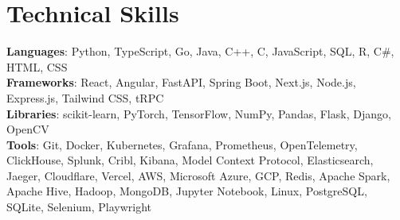 \documentclass[letterpaper,11pt]{article}
\begin{document}
\section{Technical Skills}
 \begin{itemize}[leftmargin=0.15in, label={}]
    \small{\item{
     \textbf{Languages}{: Python, TypeScript, Go, Java, C++, C, JavaScript, SQL, R, C\#, HTML, CSS} \\
     \textbf{Frameworks}{: React, Angular, FastAPI, Spring Boot, Next.js, Node.js, Express.js, Tailwind CSS, tRPC} \\
     \textbf{Libraries}{: scikit-learn, PyTorch, TensorFlow, NumPy, Pandas, Flask, Django, OpenCV} \\
     \textbf{Tools}{: Git, Docker, Kubernetes, Grafana, Prometheus, OpenTelemetry, ClickHouse, Splunk, Cribl, Kibana, Model Context Protocol, Elasticsearch, Jaeger, Cloudflare, Vercel, AWS, Microsoft Azure, GCP, Redis, Apache Spark, Apache Hive, Hadoop, MongoDB, Jupyter Notebook, Linux, PostgreSQL, SQLite, Selenium, Playwright} \\
    }}
 \end{itemize}

\end{document}
